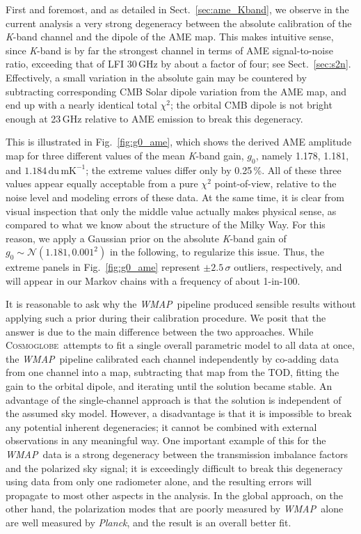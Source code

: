 \documentclass[twocolumn]{../../common/aa}
\def\WMAP{\emph{WMAP}}
\def\Planck{\emph{Planck}}
\newcommand{\cosmoglobe}{\textsc{Cosmoglobe}}
\newcommand{\K}[0]{\textit K}
\begin{document}
First and foremost, and as detailed in Sect.~\ref{sec:ame_Kband}, we observe in the current analysis a very strong degeneracy between the absolute calibration of the \K-band channel and the dipole of the AME map. This makes intuitive sense, since \K-band is by far the strongest channel in terms of AME signal-to-noise ratio, exceeding that of LFI 30\,GHz by about a factor of four; see Sect.~\ref{sec:s2n}. Effectively, a small variation in the absolute gain may be countered by subtracting corresponding CMB Solar dipole variation from the AME map, and end up with a nearly identical total $\chi^2$; the orbital CMB dipole is not bright enough at 23\,GHz relative to AME emission to break this degeneracy.

This is illustrated in Fig.~\ref{fig:g0_ame}, which shows the derived AME amplitude map for three different values of the mean \K-band gain, $g_0$, namely 1.178, 1.181, and $1.184\,\mathrm{du\,mK^{-1}}$; the extreme values differ only by 0.25\,\%. All of these three values appear equally acceptable from a pure $\chi^2$ point-of-view, relative to the noise level and modeling errors of these data. At the same time, it is clear from visual inspection that only the middle value actually makes physical sense, as compared to what we know about the structure of the Milky Way. For this reason, we apply a Gaussian prior on the absolute \K-band gain of $g_0 \sim \mathcal N(1.181, 0.001^2)$ in the following, to regularize this issue. Thus, the extreme panels in Fig.~\ref{fig:g0_ame} represent $\pm2.5\,\sigma$ outliers, respectively, and will appear in our Markov chains with a frequency of about 1-in-100.

It is reasonable to ask why the \WMAP\ pipeline produced sensible results without applying such a prior during their calibration procedure. We posit that the answer is due to the main difference between the two approaches. While \cosmoglobe\ attempts to fit a single overall parametric model to all data at once, the \WMAP\ pipeline calibrated each channel independently by co-adding data from one channel into a map, subtracting that map from the TOD, fitting the gain to the orbital dipole, and iterating until the solution became stable. An advantage of the single-channel approach is that the solution is independent of the assumed sky model. However, a disadvantage is that it is impossible to break any potential inherent degeneracies; it cannot be combined with external observations in any meaningful way. One important example of this for the \WMAP\ data is a strong degeneracy between the transmission imbalance factors and the polarized sky signal; it is exceedingly difficult to break this degeneracy using data from only one radiometer alone, and the resulting errors will propagate to most other aspects in the analysis. In the global approach, on the other hand, the polarization modes that are poorly measured by \WMAP\ alone are well measured by \Planck, and the result is an overall better fit. 
\end{document}
